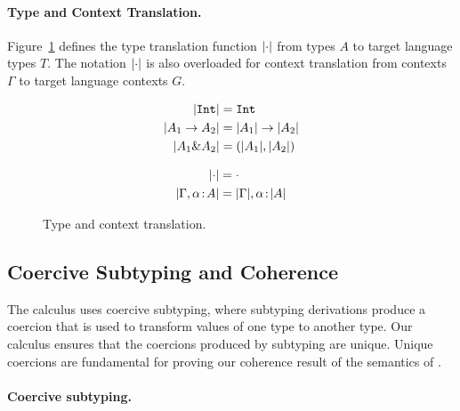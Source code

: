 \paragraph{Type and Context Translation.}

Figure~\ref{fig:type-and-context-translation} defines the type translation
function $\lvert \cdot \rvert$ from \name types $A$ to target language types $T$. The
notation $\lvert \cdot \rvert$ is also overloaded for context translation from \name
contexts $\Gamma$ to target language contexts $G$.

\begin{figure}[t]

  \begin{align*}
    \lvert \texttt{Int} \rvert     &= \texttt{Int} \\
    \lvert A_1 \to A_2 \rvert    &= \lvert A_1 \rvert \to \lvert A_2 \rvert \\
    \lvert A_1 \& A_2 \rvert &= (\lvert A_1 \rvert, \lvert A_2 \rvert) \\
  \end{align*}


  \begin{align*}
    \lvert \cdot \rvert                      &= \cdot \\
    \lvert \Gamma, \alpha \!:\! A \rvert &= \lvert \Gamma \rvert, \alpha \!:\! \lvert A \rvert
  \end{align*}

  \caption{Type and context translation.}
  \label{fig:type-and-context-translation}
\end{figure}



\subsection{Coercive Subtyping and Coherence} 
The \name calculus uses coercive subtyping, where subtyping
derivations produce a coercion that is used to transform values of one
type to another type. 
Our calculus ensures that the coercions produced
by subtyping are unique. Unique coercions are fundamental for proving 
our coherence result of the semantics of \name.


\paragraph{Coercive subtyping.}

